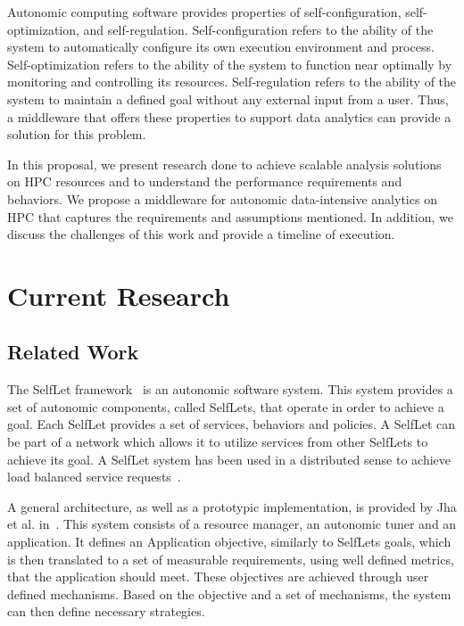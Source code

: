 Autonomic computing software provides properties of self-configuration, 
self-optimization, and self-regulation. Self-configuration refers to the 
ability of the system to automatically configure its own execution environment 
and process. Self-optimization refers to the ability of the system to function 
near optimally by monitoring and controlling its resources. Self-regulation 
refers to the ability of the system to maintain a defined goal without any 
external input from a user. Thus, a middleware that offers these properties to 
support data analytics can provide a solution for this problem.

In this proposal, we present research done to achieve scalable analysis 
solutions on HPC resources and to understand the performance requirements and 
behaviors. We propose a middleware for autonomic data-intensive analytics on 
HPC that captures the requirements and assumptions mentioned. In addition, we 
discuss the challenges of this work and provide a timeline of execution.

\section{Current Research}

\subsection{Related Work}

The SelfLet framework~\cite{bindelli2008building} is an autonomic software 
system. This system provides a set of autonomic components, called SelfLets, 
that operate in order to achieve a goal. Each SelfLet provides a set of 
services, behaviors and policies. A SelfLet can be part of a network which 
allows it to utilize services from other SelfLets to achieve its goal. A 
SelfLet system has been used in a distributed sense to achieve load balanced 
service requests~\cite{calcavecchia2010emergence}.

A general architecture, as well as a prototypic implementation, is provided by 
Jha et al. in~\cite{jha2009self}. This system consists of a resource manager, 
an autonomic tuner and an application. It defines an Application objective, 
similarly to SelfLets goals, which is then translated to a set of measurable 
requirements, using well defined metrics, that the application should meet. 
These objectives are achieved through user defined mechanisms. Based on the 
objective and a set of mechanisms, the system can then define necessary 
strategies.

